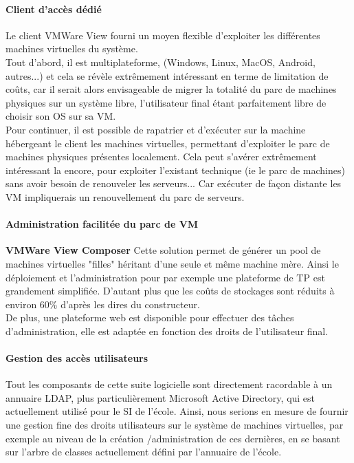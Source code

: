 \paragraph{Client d'accès dédié}
Le client VMWare View fourni un moyen flexible d'exploiter les différentes machines virtuelles du système.\\
Tout d'abord, il est multiplateforme, (Windows, Linux, MacOS, Android, autres...) et cela se révèle extrêmement intéressant en terme de limitation de coûts, car il serait alors envisageable de migrer la totalité du parc de machines physiques  sur un système libre, l'utilisateur final étant parfaitement libre de choisir son OS sur sa VM.\\ 
Pour continuer, il est possible de rapatrier et d'exécuter sur la machine hébergeant le client les machines virtuelles, permettant d'exploiter le parc de machines physiques présentes localement. Cela peut s'avérer extrêmement intéressant la encore, pour exploiter l'existant technique (ie le parc de machines) sans avoir besoin de renouveler les serveurs... Car exécuter de façon distante les VM impliquerais un renouvellement du parc de serveurs.\\

\paragraph{Administration facilitée du parc de VM}
\textbf{VMWare View Composer} Cette solution permet de générer un pool de machines virtuelles "filles" héritant d'une seule et même machine mère. Ainsi le déploiement et l'administration pour par exemple une plateforme de TP est grandement simplifiée. D'autant plus que les coûts de stockages sont réduits à environ 60\% d'après les dires du constructeur.\\
De plus, une plateforme web est disponible pour effectuer des tâches d'administration, elle est adaptée en fonction des droits de l'utilisateur final.

\paragraph{Gestion des accès utilisateurs}
Tout les composants de cette suite logicielle sont directement racordable à un annuaire LDAP, plus particulièrement Microsoft Active Directory, qui est actuellement utilisé pour le SI de l'école. Ainsi, nous serions en mesure de fournir une gestion fine des droits utilisateurs sur le système de machines virtuelles, par exemple au niveau de la création /administration de ces dernières, en se basant sur l'arbre de classes actuellement défini par l'annuaire de l'école.

